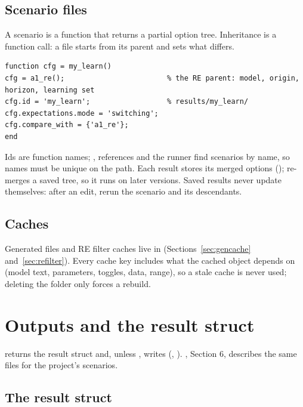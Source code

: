 \documentclass[11pt,a4paper]{article}
\begin{document}
\subsection{Scenario files}\label{sec:scenarios}

A scenario is a function that returns a partial option tree. Inheritance is a function call: a file
starts from its parent and sets what differs.
\begin{lstlisting}
function cfg = my_learn()
cfg = a1_re();                        % the RE parent: model, origin, horizon, learning set
cfg.id = 'my_learn';                  % results/my_learn/
cfg.expectations.mode = 'switching';
cfg.compare_with = {'a1_re'};
end
\end{lstlisting}
Ids are function names; ,  references and the runner find
scenarios by name, so names must be unique on the path. Each result stores its merged options
();  re-merges a saved tree, so it runs on later versions.
Saved results never update themselves: after an edit, rerun the scenario and its descendants.

\subsection{Caches}

Generated files and RE filter caches live in 
(Sections~\ref{sec:gencache} and~\ref{sec:refilter}). Every cache key includes what the cached object
depends on (model text, parameters, toggles, data, range), so a stale cache is never used; deleting
the folder only forces a rebuild.

\section{Outputs and the result struct}\label{sec:outputs}

 returns the result struct and, unless , writes
 (, ).
, Section 6, describes the same files for the project's scenarios.

\subsection{The result struct}
\end{document}
